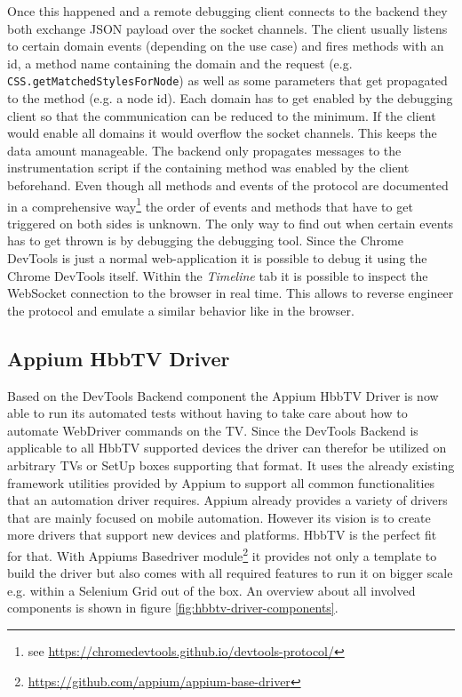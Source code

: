 Once this happened and a remote debugging client connects to the backend they both exchange JSON payload over the socket channels. The client usually listens to certain domain events (depending on the use case) and fires methods with an id, a method name containing the domain and the request (e.g. \texttt{CSS.getMatchedStylesForNode}) as well as some parameters that get propagated to the method (e.g. a node id). Each domain has to get enabled by the debugging client so that the communication can be reduced to the minimum. If the client would enable all domains it would overflow the socket channels. This keeps the data amount manageable. The backend only propagates messages to the instrumentation script if the containing method was enabled by the client beforehand. Even though all methods and events of the protocol are documented in a comprehensive way\footnote{see \url{https://chromedevtools.github.io/devtools-protocol/}} the order of events and methods that have to get triggered on both sides is unknown. The only way to find out when certain events has to get thrown is by debugging the debugging tool. Since the Chrome DevTools is just a normal web-application it is possible to debug it using the Chrome DevTools itself. Within the \textit{Timeline} tab it is possible to inspect the WebSocket connection to the browser in real time. This allows to reverse engineer the protocol and emulate a similar behavior like in the browser.

\subsection{Appium HbbTV Driver\label{sec:appiumhbbtvdriver}}

Based on the DevTools Backend component the Appium HbbTV Driver is now able to run its automated tests without having to take care about how to automate WebDriver commands on the TV. Since the DevTools Backend is applicable to all HbbTV supported devices the driver can therefor be utilized on arbitrary TVs or SetUp boxes supporting that format. It uses the already existing framework utilities provided by Appium to support all common functionalities that an automation driver requires. Appium already provides a variety of drivers that are mainly focused on mobile automation. However its vision is to create more drivers that support new devices and platforms. HbbTV is the perfect fit for that. With Appiums Basedriver module\footnote{\url{https://github.com/appium/appium-base-driver}} it provides not only a template to build the driver but also comes with all required features to run it on bigger scale e.g. within a Selenium Grid out of the box. An overview about all involved components is shown in figure \ref{fig:hbbtv-driver-components}.

